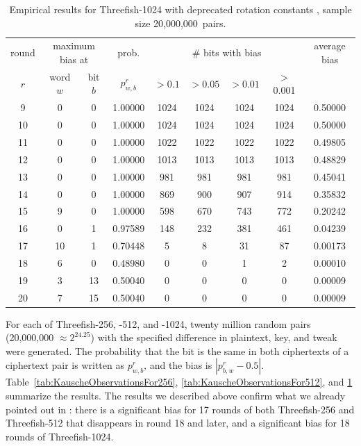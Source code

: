 \documentclass[11pt,twoside]{article}
\begin{document}
\begin{table}[tbh]
\centering
\begin{tabular}{|c|ccc|cccc|c|}
\hline
round & \multicolumn{ 2}{c}{maximum bias at}& prob. & \multicolumn{ 4}{c|}{\# bits with bias} &
average bias \\
$r$ & word $w$ & bit $b$ & $p^r_{w,b}$ & $>0.1$ & $>0.05$ & $>0.01$ & $>$
0.001 & \\  \hline
9 &  0 &  0 &    1.00000 &  1024 &  1024 &  1024 &  1024 &    0.50000 \\ \hline
10 &  0 &  0 &    1.00000 &  1024 &  1024 &  1024 &  1024 &    0.50000 \\ \hline
11 &  0 &  0 &    1.00000 &  1022 &  1022 &  1022 &  1022 &    0.49805 \\ \hline
12 &  0 &  0 &    1.00000 &  1013 &  1013 &  1013 &  1013 &    0.48829 \\ \hline
13 &  0 &  0 &    1.00000 &  981 &  981 &  981 &  981 &    0.45041 \\ \hline
14 &  0 &  0 &    1.00000 &  869 &  900 &  907 &  914 &    0.35832 \\ \hline
15 &  9 &  0 &    1.00000 &  598 &  670 &  743 &  772 &    0.20242 \\ \hline
16 &  0 &  1 &    0.97589 &  148 &  232 &  381 &  461 &    0.04239 \\ \hline
17 &  10 &  1 &    0.70448 &  5 &  8 &  31 &  87 &    0.00173 \\ \hline
18 &  6 &  0 &    0.48980 &  0 &  0 &  1 &  2 &    0.00010 \\ \hline
19 &  3 &  13 &    0.50040 &  0 &  0 &  0 &  0 &    0.00009 \\ \hline
20 &  7 &  15 &    0.50040 &  0 &  0 &  0 &  0 &    0.00009 \\ \hline
\end{tabular}
\caption{Empirical results for Threefish-1024 with deprecated rotation constants \cite{MartinKausche2008}, sample size 20,000,000~pairs.}
\label{tab:KauscheObservationsFor1024}
\end{table} 

For each of Threefish-256, -512, and -1024, twenty million random pairs (20,000,000 $\approx 2^{24.25}$) with the specified difference in plaintext, key, and tweak were generated. The probability that the bit is the same in both ciphertexts of a ciphertext pair is written as $p^r_{w,b}$, and the bias is $|p^r_{b,w}-0.5|$. Table~\ref{tab:KauscheObservationsFor256}, \ref{tab:KauscheObservationsFor512}, and \ref{tab:KauscheObservationsFor1024} summarize the results. The results we described above confirm what we already pointed out in \cite{Skein1}: there is a significant bias for 17 rounds of both Threefish-256 and Threefish-512 that disappears in round 18 and later, and a significant bias for 18 rounds of Threefish-1024.
\end{document}
